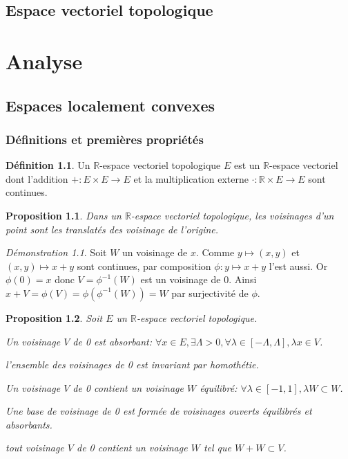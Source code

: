 \documentclass[a4paper, 11pt, french]{book}
\newenvironment{itemise}{\itemize}{\enditemize}
\theoremstyle{plain} %
\newtheorem{proposition}{Proposition}
\theoremstyle{definition} %
\newtheorem{definition}{Définition}
\theoremstyle{remark} %
\newtheorem*{demonstration}{Démonstration}
\newcommand{\1}{\mathds{1}}
\newcommand{\inv}[1]{#1^{-1}}
\newcommand{\R}{\mathbb{R}}
\begin{document}
\chapter{Espace vectoriel topologique}

\part{Analyse}

\chapter{Espaces localement convexes}

\section{Définitions et premières propriétés}

\begin{definition}
	Un $\R$-espace vectoriel topologique $E$ est un $\R$-espace vectoriel dont l'addition $+:E\times E\rightarrow E$ et la multiplication externe $\cdot:\R\times E\rightarrow E$ sont continues.
\end{definition}

\begin{proposition}
	Dans un $\R$-espace vectoriel topologique, les voisinages d’un point sont les translatés des voisinage de l'origine.
\end{proposition}

\begin{demonstration}
	Soit $W$ un voisinage de $x$.
	Comme $y\longmapsto(x, y)$ et $(x, y)\longmapsto x+y$ sont continues, par composition $\phi:y\longmapsto x+y$ l'est aussi.
	Or $\phi(0)=x$ donc $V=\inv{\phi}(W)$ est un voisinage de 0.
	Ainsi $x+V=\phi(V)=\phi(\inv{\phi}(W))=W$ par surjectivité de $\phi$.
\end{demonstration}

\begin{proposition}
	Soit $E$ un $\R$-espace vectoriel topologique.
	\begin{itemise}
		\item Un voisinage $V$ de 0 est absorbant: $\forall x\in E, \exists\Lambda>0, \forall\lambda\in[-\Lambda, \Lambda], \lambda x\in V$.
		\item l'ensemble des voisinages de 0 est invariant par homothétie.
		\item Un voisinage $V$ de 0 contient un voisinage $W$ équilibré: $\forall\lambda\in[-1, 1], \lambda W\subset W$.
		\item Une base de voisinage de 0 est formée de voisinages ouverts équilibrés et absorbants.
		\item tout voisinage $V$ de 0 contient un voisinage $W$ tel que $W+W\subset V$.
	\end{itemise}
\end{proposition}
\end{document}
